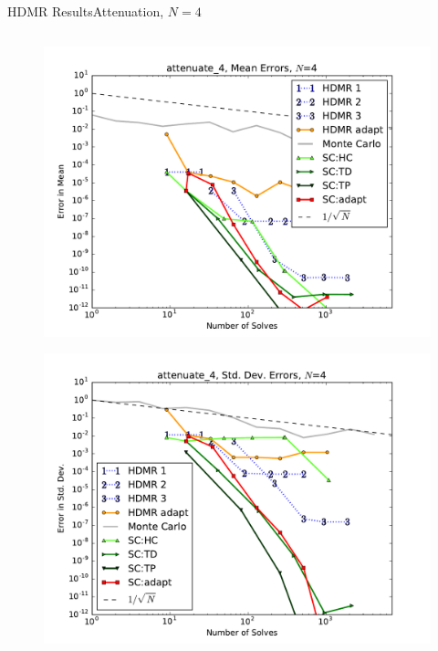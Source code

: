\documentclass{beamer}
\begin{document}
\begin{frame}{HDMR Results}{Attenuation, $N=4$}
\begin{columns}
\begin{column}{0.5\textwidth}
\begin{figure}[h!]
          \includegraphics[width=0.8\linewidth]{anlmodels/attenuate_4_mean_errs}
        \end{figure}
        \vspace{-20pt}
        \begin{figure}[h!]
          \centering
          \includegraphics[width=0.8\linewidth]{anlmodels/attenuate_4_variance_errs}
        \end{figure}
   \end{column}
 \end{columns}
\end{frame}
\end{document}
